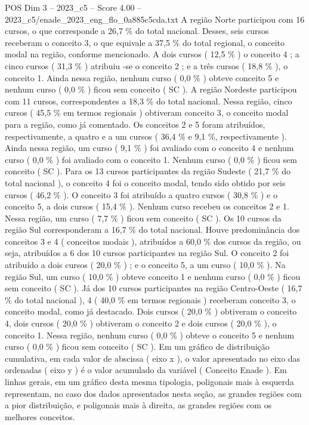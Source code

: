 \begin{textsample}{POS Dim 3 – 2023\_c5 – Score 4.00 – 2023\_c5/enade\_2023\_eng\_flo\_0a885c5cda.txt}
A região Norte participou com 16 cursos, o que corresponde a 26,7 \% do total nacional.
Desses, seis cursos receberam o conceito 3, o que equivale a 37,5 \% do total regional, o conceito modal na região, conforme mencionado.
A dois cursos ( 12,5 \% ) o conceito 4 ; a cinco cursos ( 31,3 \% ) atribuiu -se o conceito 2 ; e a três cursos ( 18,8 \% ), o conceito 1.
Ainda nessa região, nenhum curso ( 0,0 \% ) obteve conceito 5 e nenhum curso ( 0,0 \% ) ficou sem conceito ( SC ).
A região Nordeste participou com 11 cursos, correspondentes a 18,3 \% do total nacional.
Nessa região, cinco cursos ( 45,5 \% em termos regionais ) obtiveram conceito 3, o conceito modal para a região, como já comentado.
Os conceitos 2 e 5 foram atribuídos, respectivamente, a quatro e a um cursos ( 36,4 \% e 9,1 \%, respectivamente ).
Ainda nessa região, um curso ( 9,1 \% ) foi avaliado com o conceito 4 e nenhum curso ( 0,0 \% ) foi avaliado com o conceito 1.
Nenhum curso ( 0,0 \% ) ficou sem conceito ( SC ).
Para os 13 cursos participantes da região Sudeste ( 21,7 \% do total nacional ), o conceito 4 foi o conceito modal, tendo sido obtido por seis cursos ( 46,2 \% ).
O conceito 3 foi atribuído a quatro cursos ( 30,8 \% ) e o conceito 5, a dois cursos ( 15,4 \% ).
Nenhum curso recebeu os conceitos 2 e 1.
Nessa região, um curso ( 7,7 \% ) ficou sem conceito ( SC ).
Os 10 cursos da região Sul corresponderam a 16,7 \% do total nacional.
Houve predominância dos conceitos 3 e 4 ( conceitos modais ), atribuídos a 60,0 \% dos cursos da região, ou seja, atribuídos a 6 dos 10 cursos participantes na região Sul.
O conceito 2 foi atribuído a dois cursos ( 20,0 \% ) ; e o conceito 5, a um curso ( 10,0 \% ).
Na região Sul, um curso ( 10,0 \% ) obteve conceito 1 e nenhum curso ( 0,0 \% ) ficou sem conceito ( SC ).
Já dos 10 cursos participantes na região Centro-Oeste ( 16,7 \% do total nacional ), 4 ( 40,0 \% em termos regionais ) receberam conceito 3, o conceito modal, como já destacado.
Dois cursos ( 20,0 \% ) obtiveram o conceito 4, dois cursos ( 20,0 \% ) obtiveram o conceito 2 e dois cursos ( 20,0 \% ), o conceito 1.
Nessa região, nenhum curso ( 0,0 \% ) obteve o conceito 5 e nenhum curso ( 0,0 \% ) ficou sem conceito ( SC ).
Em um gráfico de distribuição cumulativa, em cada valor de abscissa ( eixo x ), o valor apresentado no eixo das ordenadas ( eixo y ) é o valor acumulado da variável ( Conceito Enade ).
Em linhas gerais, em um gráfico desta mesma tipologia, poligonais mais à esquerda representam, no caso dos dados apresentados nesta seção, as grandes regiões com a pior distribuição, e poligonais mais à direita, as grandes regiões com os melhores conceitos.

\end{textsample}
